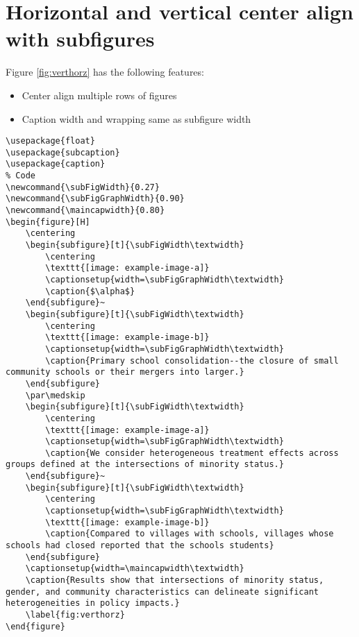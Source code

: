\documentclass[12pt,english]{article}
\begin{document}
\section{Horizontal and vertical center align with subfigures}
Figure \ref{fig:verthorz} has the following features:
\begin{itemize}
    \item Center align multiple rows of figures
    \item Caption width and wrapping same as subfigure width
\end{itemize}

\begin{lstlisting}[frame=single]
% Included Package
\usepackage{float}
\usepackage{subcaption}
\usepackage{caption}
% Code
\newcommand{\subFigWidth}{0.27}
\newcommand{\subFigGraphWidth}{0.90}
\newcommand{\maincapwidth}{0.80}
\begin{figure}[H]
    \centering
    \begin{subfigure}[t]{\subFigWidth\textwidth}
        \centering
        \texttt{[image: example-image-a]}
        \captionsetup{width=\subFigGraphWidth\textwidth}
        \caption{$\alpha$}
    \end{subfigure}~
	\begin{subfigure}[t]{\subFigWidth\textwidth}
	    \centering
    	\texttt{[image: example-image-b]}
    	\captionsetup{width=\subFigGraphWidth\textwidth}
    	\caption{Primary school consolidation--the closure of small community schools or their mergers into larger.}
	\end{subfigure}
	\par\medskip
	\begin{subfigure}[t]{\subFigWidth\textwidth}
        \centering
        \texttt{[image: example-image-a]}
        \captionsetup{width=\subFigGraphWidth\textwidth}
        \caption{We consider heterogeneous treatment effects across groups defined at the intersections of minority status.}
    \end{subfigure}~
	\begin{subfigure}[t]{\subFigWidth\textwidth}
	    \centering
	    \captionsetup{width=\subFigGraphWidth\textwidth}
    	\texttt{[image: example-image-b]}
    	\caption{Compared to villages with schools, villages whose schools had closed reported that the schools students}
	\end{subfigure}
	\captionsetup{width=\maincapwidth\textwidth}
	\caption{Results show that intersections of minority status, gender, and community characteristics can delineate significant heterogeneities in policy impacts.}
	\label{fig:verthorz}
\end{figure}
\end{lstlisting}
\end{document}

